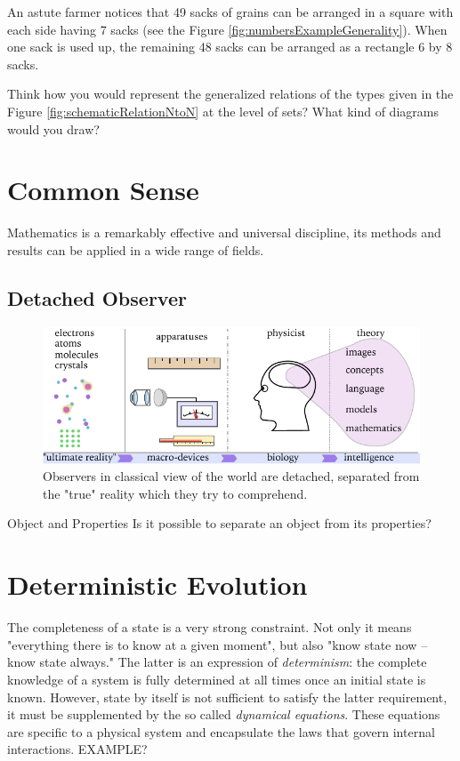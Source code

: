An astute farmer notices that 49 sacks of grains can be arranged
in a square with each side having 7 sacks (see the Figure
\ref{fig:numbersExampleGenerality}). When one sack is used up, the
remaining 48 sacks can be arranged as a rectangle 6 by 8 sacks.


\begin{exercise}\label{exe:relationsGeneral}
Think how you would represent the generalized relations of the types
given in the Figure \ref{fig:schematicRelationNtoN} at the level of
sets? What kind of diagrams would you draw?
\end{exercise}

\section{Common Sense}
Mathematics is a remarkably effective and universal discipline, its
methods and
results can be applied in a wide range of fields.
\subsection{Detached Observer}
\begin{figure}[htbp]
	\centering
	\includegraphics[scale=1.0]{commonSensePerception}
	\caption{Observers in classical view of the world are detached, separated from the "true" reality which they try to comprehend.}
	\label{fig:commonSensePerception}
\end{figure}

\begin{mybio}{Object and Properties}
	Is it possible to separate an object from its properties?
\end{mybio}


\section{Deterministic Evolution}
The completeness of a state is a very strong constraint. Not only it means "everything there is to know at a given moment", but also "know state now -- know state always." The latter is an expression of \emph{determinism}: the complete knowledge of a system is fully determined at all times once an initial state is known. However, state by itself  is not sufficient to satisfy the latter requirement, it must be supplemented by the so called \emph{dynamical equations}. These equations are specific to a physical system and encapsulate the laws that govern internal interactions. EXAMPLE?

